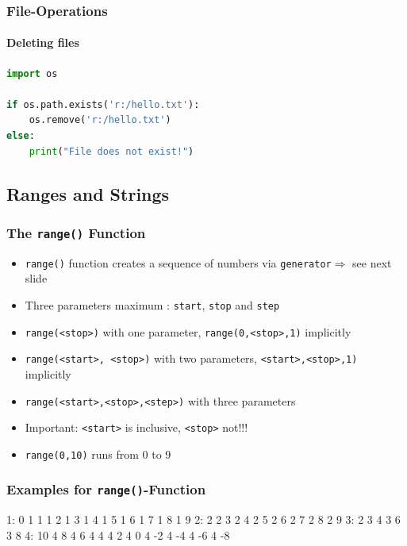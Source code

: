 \documentclass[ngerman]{beamer}
\newcommand{\ta}[1]{\textattachfile[color=1 0 0]{#1}{Code}}
\begin{document}
\begin{frame}[containsverbatim]
\frametitle{File-Operations}
\framesubtitle{Deleting files}

\begin{lstlisting}[language=Python,caption={Deleting a file}]
import os

if os.path.exists('r:/hello.txt'):
    os.remove('r:/hello.txt')
else:
    print("File does not exist!")   
\end{lstlisting}

\end{frame}

\subsection{Ranges and Strings}



\begin{frame}[containsverbatim]
\frametitle{The \texttt{range()} Function}

\begin{itemize}
\item \texttt{range()} function creates a sequence of numbers via \texttt{generator}$\Rightarrow$ see next slide
\item Three parameters maximum : \texttt{start}, \texttt{stop} and \texttt{step}
\item \texttt{range(<stop>)} with one parameter,  \texttt{range(0,<stop>,1)} implicitly
\item \texttt{range(<start>, <stop>)} with two parameters, \texttt{<start>,<stop>,1)} implicitly 
\item \texttt{range(<start>,<stop>,<step>)} with three parameters
\item Important: \texttt{<start>} is inclusive, \texttt{<stop>} not!!!
\item \texttt{range(0,10)} runs from 0 to 9
\end{itemize}
\end{frame}

\begin{frame}[containsverbatim]
\frametitle{Examples for \texttt{range()}-Function}



\begin{ausgabe}
1: 0	1 1	1 2	1 3	1 4	1 5	1 6	1 7	1 8	1 9
2: 2	2 3	2 4	2 5	2 6	2 7	2 8	2 9		
3: 2	3 4	3 6	3 8						
4: 10	4 8	4 6	4 4	4 2	4 0	4 -2	4 -4	4 -6	4 -8
\end{ausgabe}

\end{frame}
\end{document}
